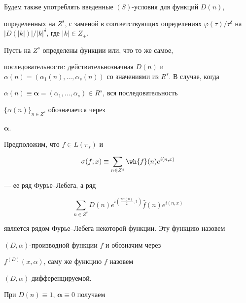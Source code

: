 Будем также употреблять введенные $(S)$-условия для функций $D(n)$,


определенных на $Z^s$, с заменой в соответствующих определениях $\varphi


(\tau)/\tau^{\delta}$ на $|D(|k|)|/|k|^{\delta}$, где $|k|\in Z_+$.





Пусть на $Z^s$ определены функции или, что то же самое,


последовательности: действительнозначная $D(n)$ и $\alpha(n)=


(\alpha_1(n),\dotsc,


\alpha_s(n))$ со значениями из $R^s$. В случае, когда 


$\alpha(n) \equiv {\boldsymbol{\alpha}}=


(\alpha_1,\dotsc,\alpha_s)\in R^s $, вся последовательность 


$\{\alpha(n) \}_{n\in Z^s}$ обозначается через 


${\boldsymbol{\alpha}}$. 





Предположим, что $f \in L(\pi_s)$ и


\begin{equation} \label{d 1}


\sigma(f; x)\equiv \sum_{n\in Z^s}\wh{f}(n)e^{i(n,x)}


\end{equation}


--- ее ряд Фурье--Лебега, а ряд


\begin{equation} \label{d 2}


\sum_{n\in Z^s}D(n) e^{i(\frac{\pi {\alpha}(n)}{2},


1)} {\widehat{f}(n)} e^{i(n,x)}


\end{equation}


является рядом Фурье--Лебега некоторой функции. Эту функцию назовем 


$(D, \alpha)$-производной функции $f$ и обозначим через 


$f^{(D)}(x, \alpha)$, саму же функцию $f$ назовем


$(D, \alpha)$-дифференцируемой.





При $D(n)\equiv 1$, ${\boldsymbol{\alpha}}\equiv{0}$ получаем 


